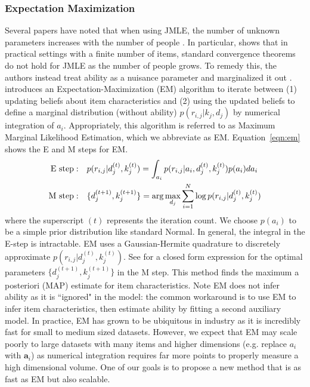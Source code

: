 \subsubsection{Expectation Maximization}
Several papers have noted that when using JMLE, the number of unknown parameters increases with the number of people \cite{bock1981marginal,haberman1977maximum}.
In particular, \cite{haberman1977maximum} shows that in practical settings with a finite number of items, standard convergence theorems do not hold for JMLE as the number of people grows.
To remedy this, the authors instead treat ability as a nuisance parameter and marginalized it out \cite{bock1981marginal,bock1988full}.
\cite{dempster1977maximum} introduces an Expectation-Maximization (EM) algorithm to iterate between (1) updating beliefs about item characteristics and (2) using the updated beliefs to define a marginal distribution (without ability) $p(r_{i,j}|k_j, d_j)$ by numerical integration of $a_i$.
Appropriately, this algorithm is referred to as Maximum Marginal Likelihood Estimation, which we abbreviate as EM.
Equation~\ref{eqn:em} shows the E and M steps for EM.
\begin{align}
    \textup{E step}:&\quad p(r_{i,j}|d^{(t)}_j, k^{(t)}_j) = \int_{a_i} p(r_{i,j}|a_i, d^{(t)}_j, k^{(t)}_j)p(a_i) d a_i \\
    \textup{M step}:&\quad \{d_j^{(t+1)}, k_j^{(t+1)}\} = \arg\max_{d_j} \sum_{i=1}^N \log p(r_{i,j} |d^{(t)}_j, k^{(t)}_j)
    \label{eqn:em}
\end{align}
where the superscript $(t)$ represents the iteration count.
We choose $p(a_i)$ to be a simple prior distribution like standard Normal.
In general, the integral in the E-step is intractable.
EM uses a Gaussian-Hermite quadrature to discretely approximate $p(r_{i,j}|d^{(t)}_j,k^{(t)}_j)$.
See \cite{harwell1988item} for a closed form expression for the optimal parameters $\{d_j^{(t+1)}, k_j^{(t+1)}\}$ in the M step.
This method finds the maximum a posteriori (MAP) estimate for item characteristics.
Note EM does not infer ability as it is ``ignored" in the model: the common workaround is to use EM to infer item characteristics, then estimate ability by fitting a second auxiliary model.
In practice, EM has grown to be ubiquitous in industry as it is incredibly fast for small to medium sized datasets.
However, we expect that EM may scale poorly to large datasets with many items and higher dimensions (e.g. replace $a_i$ with $\textbf{a}_i$) as numerical integration requires far more points to properly measure a high dimensional volume.
One of our goals is to propose a new method that is as fast as EM but also scalable.

